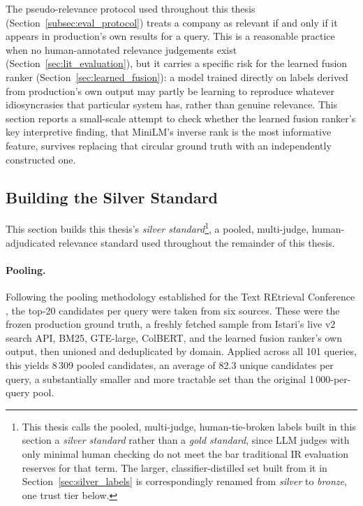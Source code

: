 \documentclass[a4paper,oneside,bibliography=totoc]{scrbook}
\begin{document}
The pseudo-relevance protocol used throughout this thesis (Section~\ref{subsec:eval_protocol}) treats a company as relevant if and only if it appears in production's own results for a query. This is a reasonable practice when no human-annotated relevance judgements exist (Section~\ref{sec:lit_evaluation}), but it carries a specific risk for the learned fusion ranker (Section~\ref{sec:learned_fusion}): a model trained directly on labels derived from production's own output may partly be learning to reproduce whatever idiosyncrasies that particular system has, rather than genuine relevance. This section reports a small-scale attempt to check whether the learned fusion ranker's key interpretive finding, that MiniLM's inverse rank is the most informative feature, survives replacing that circular ground truth with an independently constructed one.

\subsection{Building the Silver Standard}
\label{subsec:pooled_gold_standard}

This section builds this thesis's \emph{silver standard}\footnote{This thesis calls the pooled, multi-judge, human-tie-broken labels built in this section a \emph{silver standard} rather than a \emph{gold standard}, since LLM judges with only minimal human checking do not meet the bar traditional IR evaluation reserves for that term. The larger, classifier-distilled set built from it in Section~\ref{sec:silver_labels} is correspondingly renamed from \emph{silver} to \emph{bronze}, one trust tier below.}, a pooled, multi-judge, human-adjudicated relevance standard used throughout the remainder of this thesis.

\paragraph{Pooling.} Following the pooling methodology established for the Text REtrieval Conference \citep{voorhees2002philosophy, zobel1998reliable}, the top-20 candidates per query were taken from six sources. These were the frozen production ground truth, a freshly fetched sample from Istari's live v2 search API, BM25, GTE-large, ColBERT, and the learned fusion ranker's own output, then unioned and deduplicated by domain. Applied across all 101 queries, this yields 8\,309 pooled candidates, an average of 82.3 unique candidates per query, a substantially smaller and more tractable set than the original 1\,000-per-query pool.
\end{document}
